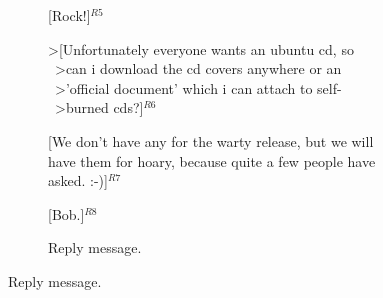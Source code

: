 \begin{figure}
\begin{minipage}{.46\textwidth}
{{\begin{subfigure}[b]{0.99\textwidth}
                    [Rock!]$^{R5}$\vspace{0.1cm}

                    \textgreater [Unfortunately everyone wants an ubuntu cd, so \\ \ 
                    \textgreater can i download the cd covers anywhere or an \\ \ 
                    \textgreater 'official document' which i can attach to self- \\ \ 
                    \textgreater burned cds?]$^{R6}$\vspace{0.1cm}

                    [We don't have any for the warty release, but we will have them for hoary, %
                    because quite a few people have asked. :-)]$^{R7}$\vspace{0.1cm}

                    [Bob.]$^{R8}$ %

                    \caption{Reply message.}
                    \label{fig:exampleReply}
                \end{subfigure}
            }
        }


\end{minipage}
\end{figure}
